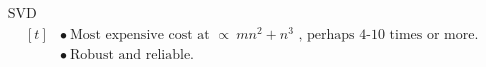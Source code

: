 \documentclass[12pt]{article}
\begin{document}
\vspace{10pt}
\(\begin{aligned}
	&\text{SVD}\\[5pt]
	&\hspace{10pt}\begin{aligned}[t]
		&\bullet\ \text{Most expensive cost at } \propto\ mn^2 + n^3 \text{ , perhaps 4-10 times or more.}\\[2pt]
		&\bullet\ \text{Robust and reliable.}
	\end{aligned}
\end{aligned}\)


\newpage
\end{document}
